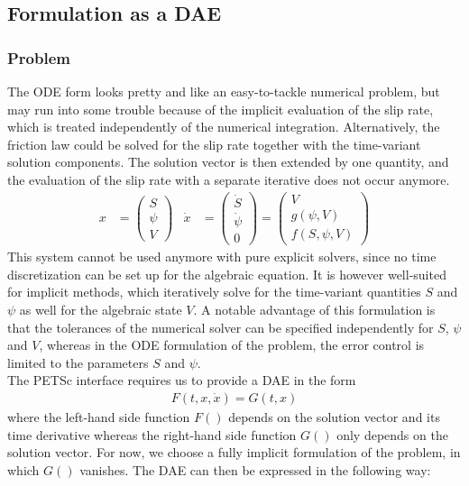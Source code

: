 \subsection{Formulation as a DAE}
\subsubsection{Problem}
The ODE form looks pretty and like an easy-to-tackle numerical problem, but may run into some trouble because of the implicit evaluation of the slip rate, which is treated independently of the numerical integration. Alternatively, the friction law could be solved for the slip rate together with the time-variant solution components. The solution vector is then extended by one quantity, and the evaluation of the slip rate with a separate iterative does not occur anymore.
\begin{align}
	\label{eq:DAE_formulation_SEAS}
	x &= \begin{pmatrix}
			S \\ \psi \\ V
		 \end{pmatrix} & \dot{x} &= \begin{pmatrix}
										\dot{S} \\ \dot{\psi} \\ 0
									\end{pmatrix} = \begin{pmatrix}
										V \\ g(\psi, V) \\ f(S,\psi,V)
									\end{pmatrix}
\end{align}
This system cannot be used anymore with pure explicit solvers, since no time discretization can be set up for the algebraic equation. It is however well-suited for implicit methods, which iteratively solve for the time-variant quantities $S$ and $\psi$ as well for the algebraic state $V$. A notable advantage of this formulation is that the tolerances of the numerical solver can be specified independently for $S$, $\psi$ and $V$, whereas in the ODE formulation of the problem, the error control is limited to the parameters $S$ and $\psi$. \\
The PETSc interface requires us to provide a DAE in the form
\begin{align}
	F(t, x,\dot{x}) = G(t,x) 
\end{align}
where the left-hand side function $F()$ depends on the solution vector and its time derivative whereas the right-hand side function $G()$ only depends on the solution vector. For now, we choose a fully implicit formulation of the problem, in which $G()$ vanishes. The DAE can then be expressed in the following way: 
